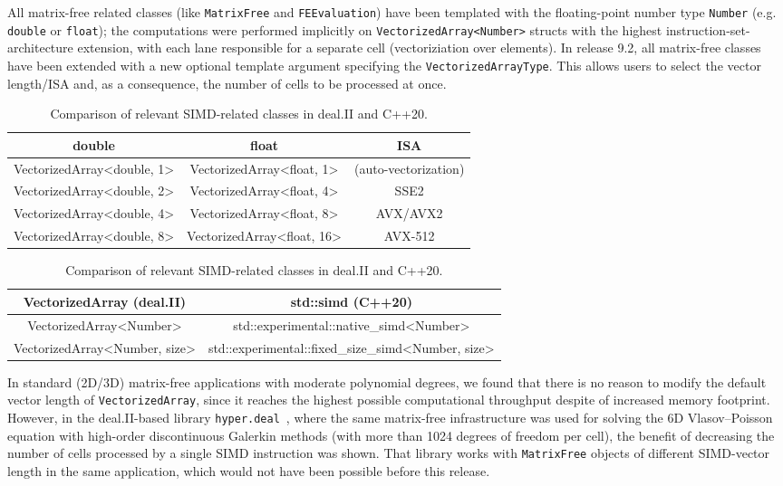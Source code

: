 \documentclass{ansarticle-preprint}
\begin{document}
All matrix-free related classes (like \texttt{MatrixFree} and \texttt{FEEvaluation}) 
have been templated with the floating-point number type \texttt{Number} (e.g. \texttt{double} or \texttt{float}); the computations were performed implicitly 
on \texttt{VectorizedArray<Number>} structs with the highest 
instruction-set-architecture extension, with each lane responsible for a separate 
cell (vectoriziation over elements). In release 9.2, all matrix-free classes 
have been extended with a new optional template argument specifying the 
\texttt{VectorizedArrayType}. This allows users to select the vector length/ISA and, 
as a consequence, the number of cells to be processed at once. 
\begin{table}
\caption{Supported vector lengths of the class \texttt{VectorizedArray} and 
the corresponding instruction-set-architecture extensions. }\label{tab:vectorizedarray}
\centering
\begin{tabular}{ccc}
\toprule
\textbf{double} & \textbf{float} & \textbf{ISA}\\
\midrule
VectorizedArray<double, 1> & VectorizedArray<float, 1> & (auto-vectorization) \\
VectorizedArray<double, 2> & VectorizedArray<float, 4> & SSE2 \\ 
VectorizedArray<double, 4> & VectorizedArray<float, 8> & AVX/AVX2 \\ 
VectorizedArray<double, 8> & VectorizedArray<float, 16> & AVX-512 \\ 
\bottomrule
\end{tabular}

\caption{Comparison of relevant SIMD-related classes in deal.II and C++20.}\label{tab:simd}
\centering
\begin{tabular}{cc}
\toprule
\textbf{VectorizedArray (deal.II)} & \textbf{std::simd (C++20)} \\
\midrule
VectorizedArray<Number> & std::experimental::native\_simd<Number> \\
VectorizedArray<Number, size> & std::experimental::fixed\_size\_simd<Number, size> \\ \bottomrule
\end{tabular}
\end{table}

In standard (2D/3D) matrix-free applications with moderate polynomial degrees, 
we found that there is no reason to modify the default vector length of 
\texttt{VectorizedArray}, since it reaches the highest possible computational 
throughput despite of increased memory footprint. However, in the deal.II-based 
library \texttt{hyper.deal}~\cite{munch2020hyperdeal}, where the same matrix-free 
infrastructure was used for solving the 6D Vlasov--Poisson equation with high-order 
discontinuous Galerkin methods (with more than 1024 degrees of freedom per cell), the 
benefit of decreasing the number of cells processed by a single SIMD instruction was 
shown. That library works with \texttt{MatrixFree} objects of different SIMD-vector 
length in the same application, which would not have been possible before this 
release.
\end{document}
